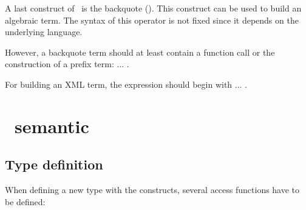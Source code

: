 A last construct of \TOM\ is the backquote (). This construct
can be used to build an algebraic term. The syntax of this operator is
not fixed since it depends on the underlying language. 

However, a backquote term should at least contain a function call or the
construction of a prefix term: \lex{(} ... \lex{)}.

For building an XML term, the expression should begin with \lex{(} ... \lex{)}.

\section{\TOM\ semantic}

\subsection{Type definition}\label{typedef}
\noindent
When defining a new type with the  constructs,
several access functions have to be defined:
